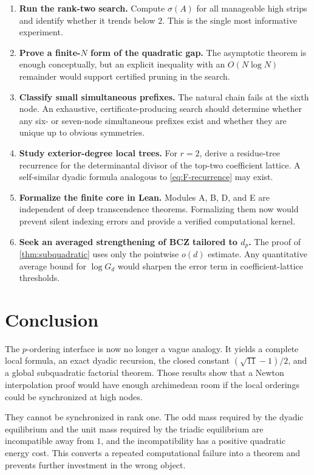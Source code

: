 \documentclass[11pt]{article}
\theoremstyle{definition}
\theoremstyle{remark}
\begin{document}
\begin{enumerate}
\item \textbf{Run the rank-two search.}  Compute $\sigma(A)$ for all manageable high strips and identify whether it trends below $2$.  This is the single most informative experiment.
\item \textbf{Prove a finite-$N$ form of the quadratic gap.}  The asymptotic theorem is enough conceptually, but an explicit inequality with an $O(N\log N)$ remainder would support certified pruning in the search.
\item \textbf{Classify small simultaneous prefixes.}  The natural chain fails at the sixth node.  An exhaustive, certificate-producing search should determine whether any six- or seven-node simultaneous prefixes exist and whether they are unique up to obvious symmetries.
\item \textbf{Study exterior-degree local trees.}  For $r=2$, derive a residue-tree recurrence for the determinantal divisor of the top-two coefficient lattice.  A self-similar dyadic formula analogous to \eqref{eq:F-recurrence} may exist.
\item \textbf{Formalize the finite core in Lean.}  Modules A, B, D, and E are independent of deep transcendence theorems.  Formalizing them now would prevent silent indexing errors and provide a verified computational kernel.
\item \textbf{Seek an averaged strengthening of BCZ tailored to $d_p$.}  The proof of \cref{thm:subquadratic} uses only the pointwise $o(d)$ estimate.  Any quantitative average bound for $\log G_d$ would sharpen the error term in coefficient-lattice thresholds.
\end{enumerate}

\section{Conclusion}

The $p$-ordering interface is now no longer a vague analogy.  It yields a complete local formula, an exact dyadic recursion, the closed constant $(\sqrt{11}-1)/2$, and a global subquadratic factorial theorem.  Those results show that a Newton interpolation proof would have enough archimedean room if the local orderings could be synchronized at high nodes.

They cannot be synchronized in rank one.  The odd mass required by the dyadic equilibrium and the unit mass required by the triadic equilibrium are incompatible away from $1$, and the incompatibility has a positive quadratic energy cost.  This converts a repeated computational failure into a theorem and prevents further investment in the wrong object.
\end{document}
